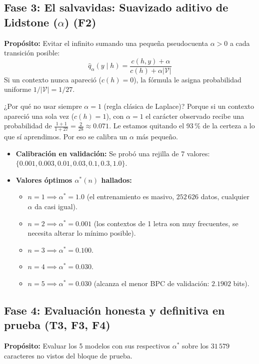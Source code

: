\documentclass[11pt,letterpaper]{article}
\begin{document}
\subsection{Fase 3: El salvavidas: Suavizado aditivo de Lidstone (\texorpdfstring{$\alpha$}{alpha}) (F2)}
\textbf{Propósito:} Evitar el infinito sumando una pequeña pseudocuenta $\alpha > 0$ a cada transición posible:
$$\hat{q}_\alpha(y \mid h) = \frac{c(h,y) + \alpha}{c(h) + \alpha |\mathcal{V}|}$$
Si un contexto nunca apareció ($c(h)=0$), la fórmula le asigna probabilidad uniforme $1/|\mathcal{V}| = 1/27$.

\begin{conceptbox}{¿Por qué no usar siempre $\alpha=1$ (regla clásica de Laplace)?}
Porque si un contexto apareció una sola vez ($c(h)=1$), con $\alpha=1$ el carácter observado recibe una probabilidad de $\frac{1+1}{1+27} = \frac{2}{28} \approx 0.071$. Le estamos quitando el 93\,\% de la certeza a lo que sí aprendimos. Por eso se calibra un $\alpha$ más pequeño.
\end{conceptbox}

\begin{itemize}[leftmargin=*, nosep]
    \item \textbf{Calibración en validación:} Se probó una rejilla de 7 valores: $\{0.001, 0.003, 0.01, 0.03, 0.1, 0.3, 1.0\}$.
    \item \textbf{Valores óptimos $\alpha^*(n)$ hallados:}
    \begin{itemize}[nosep]
        \item $n=1 \implies \alpha^* = 1.0$ (el entrenamiento es masivo, $252\,626$ datos, cualquier $\alpha$ da casi igual).
        \item $n=2 \implies \alpha^* = 0.001$ (los contextos de 1 letra son muy frecuentes, se necesita alterar lo mínimo posible).
        \item $n=3 \implies \alpha^* = 0.100$.
        \item $n=4 \implies \alpha^* = 0.030$.
        \item $n=5 \implies \alpha^* = \mathbf{0.030}$ (alcanza el menor BPC de validación: $2.1902$ bits).
    \end{itemize}
\end{itemize}

\subsection{Fase 4: Evaluación honesta y definitiva en prueba (T3, F3, F4)}
\textbf{Propósito:} Evaluar los 5 modelos con sus respectivos $\alpha^*$ sobre los $31\,579$ caracteres no vistos del bloque de prueba.
\end{document}
